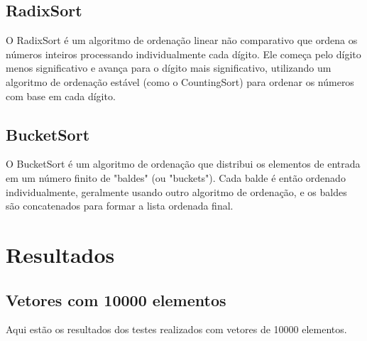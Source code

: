 \documentclass[a4paper, 12pt]{article} %
\begin{document}
\subsection{RadixSort}
O RadixSort é um algoritmo de ordenação linear não comparativo que ordena os números inteiros processando individualmente cada dígito. Ele começa pelo dígito menos significativo e avança para o dígito mais significativo, utilizando um 
algoritmo de ordenação estável (como o CountingSort) para ordenar os números com base em cada dígito.

\subsection{BucketSort}
O BucketSort é um algoritmo de ordenação que distribui os elementos de entrada em um número finito de "baldes" (ou "buckets"). Cada balde é então ordenado individualmente, geralmente usando outro algoritmo de ordenação, e os baldes são concatenados para formar a lista ordenada final.

\section{Resultados}
\subsection{Vetores com 10000 elementos}
Aqui estão os resultados dos testes realizados com vetores de 10000 elementos.
\end{document}
